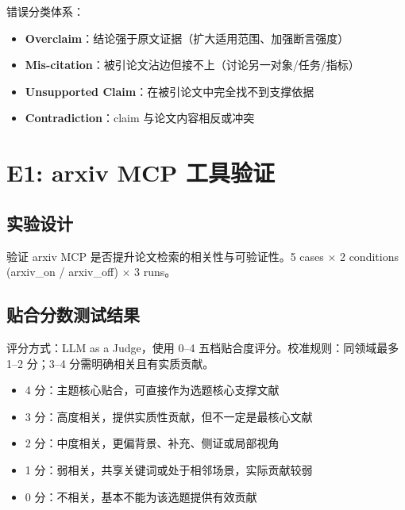 \documentclass[UTF8,fontset=fandol,a4paper,12pt]{ctexart}
\begin{document}
错误分类体系：

\begin{itemize}[nosep]
  \item \textbf{Overclaim}：结论强于原文证据（扩大适用范围、加强断言强度）
  \item \textbf{Mis-citation}：被引论文沾边但接不上（讨论另一对象/任务/指标）
  \item \textbf{Unsupported Claim}：在被引论文中完全找不到支撑依据
  \item \textbf{Contradiction}：claim 与论文内容相反或冲突
\end{itemize}

\section{E1: arxiv MCP 工具验证}

\subsection{实验设计}

验证 arxiv MCP 是否提升论文检索的相关性与可验证性。5 cases $\times$ 2 conditions (arxiv\_on / arxiv\_off) $\times$ 3 runs。

\subsection{贴合分数测试结果}

评分方式：LLM as a Judge，使用 0--4 五档贴合度评分。校准规则：同领域最多 1--2 分；3--4 分需明确相关且有实质贡献。

\begin{itemize}[nosep]
  \item 4 分：主题核心贴合，可直接作为选题核心支撑文献
  \item 3 分：高度相关，提供实质性贡献，但不一定是最核心文献
  \item 2 分：中度相关，更偏背景、补充、侧证或局部视角
  \item 1 分：弱相关，共享关键词或处于相邻场景，实际贡献较弱
  \item 0 分：不相关，基本不能为该选题提供有效贡献
\end{itemize}
\end{document}
